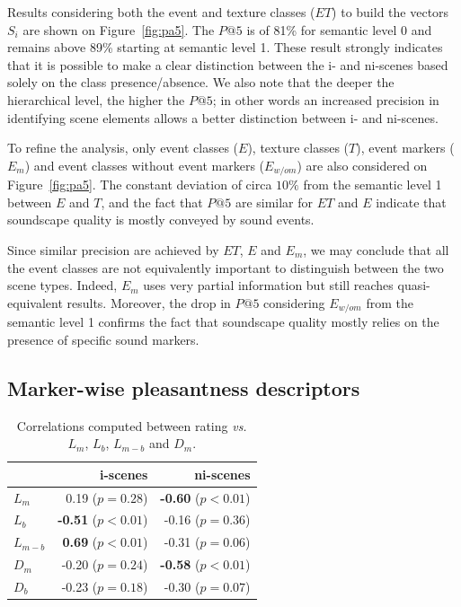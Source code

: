 \documentclass[twoside,twocolumn]{article}
\begin{document}
Results considering both the event and texture classes ($ET$) to build the vectors  $S_i$ are shown on Figure~\ref{fig:pa5}. The $P@5$ is of 81\% for semantic level 0 and remains above 89\% starting at semantic level 1. These result strongly indicates that it is possible to make a clear distinction between the i- and ni-scenes based solely on the class presence/absence. We also note that the deeper the hierarchical level, the higher the $P@5$; in other words an increased precision in identifying scene elements allows a better distinction between i- and ni-scenes. 

To refine the analysis, only event classes ($E$), texture classes ($T$), event markers ($E_m$) and event classes without event markers ($E_{w/o m}$) are also considered on Figure~\ref{fig:pa5}. The constant deviation of circa $10\%$ from the semantic level 1 between $E$ and $T$, and the fact that $P@5$ are similar for $ET$ and $E$ indicate that soundscape quality is mostly conveyed by sound events.

Since similar precision are achieved by $ET$, $E$ and $E_m$, we may conclude that all the event classes are not equivalently important to distinguish between the two scene types. Indeed, $E_m$ uses very partial information but still reaches quasi-equivalent results. Moreover, the drop in $P@5$ considering $E_{w/o m}$ from the semantic level 1 confirms the fact that soundscape quality mostly relies on the presence of specific sound markers.


\subsection{Marker-wise pleasantness descriptors}
\label{sec:QuantifyingMarkers}

\begin{table}[t]
\centering
\begin{tabular}{l r r} 
                    &   i-scenes   & ni-scenes \\
\hline
$L_m$         & 0.19  ($p=0.28$)           & \textbf{-0.60} ($p<0.01$) \\
$L_b$         & \textbf{-0.51} ($p<0.01$)  & -0.16 ($p=0.36$) \\
$L_{m-b}$     & \textbf{0.69} ($p<0.01$)   & -0.31 ($p=0.06$) \\
$D_{m}$       & -0.20  ($p=0.24$)          & \textbf{-0.58} ($p<0.01$)  \\
$D_{b}$       & -0.23  ($p=0.18$)          & -0.30 ($p=0.07$)  \\
\hline
\end{tabular}
\vspace{0.5mm}
\caption{\label{tab:numMarkers} Correlations computed between rating \emph{vs.} $L_m$, $L_b$, $L_{m-b}$ and $D_m$.}
\end{table}
\end{document}
